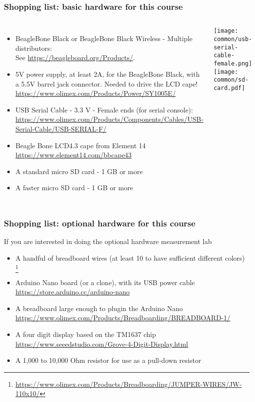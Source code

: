 \begin{frame}
\frametitle{Shopping list: basic hardware for this course}
  \begin{columns}
    \begin{itemize}
      \item BeagleBone Black or BeagleBone Black Wireless - Multiple distributors: \\
	    See \url{https://beagleboard.org/Products/}.
      \item 5V power supply, at least 2A, for the BeagleBone Black, with a 5.5V barrel
            jack connector. Needed to drive the LCD cape!\\
	    \url{https://www.olimex.com/Products/Power/SY1005E/}
      \item USB Serial Cable - 3.3 V - Female ends (for serial console): \\
	    \url{https://www.olimex.com/Products/Components/Cables/USB-Serial-Cable/USB-SERIAL-F/}
      \item Beagle Bone LCD4.3 cape from Element 14\\
            \url{https://www.element14.com/bbcape43}
      \item A standard micro SD card - 1 GB or more
      \item A faster micro SD card - 1 GB or more
    \end{itemize}
    \texttt{[image: common/usb-serial-cable-female.png]} \\
    \texttt{[image: common/sd-card.pdf]} \\
  \end{columns}
\end{frame}

\begin{frame}
\frametitle{Shopping list: optional hardware for this course}
  If you are interested in doing the optional hardware measurement lab
    \begin{itemize}
      \item A handful of breadboard wires (at least 10 to have sufficient different colors)
	    \footnote{\tiny \url{https://www.olimex.com/Products/Breadboarding/JUMPER-WIRES/JW-110x10/}}
      \item Arduino Nano board (or a clone), with its USB power cable\\
            \url{https://store.arduino.cc/arduino-nano}
      \item A breadboard large enough to plugin the Arduino Nano\\
            \url{https://www.olimex.com/Products/Breadboarding/BREADBOARD-1/}
      \item A four digit display based on the TM1637 chip\\
            \url{https://www.seeedstudio.com/Grove-4-Digit-Display.html}
      \item A 1,000 to 10,000 Ohm resistor for use as a pull-down resistor
    \end{itemize}
\end{frame}
